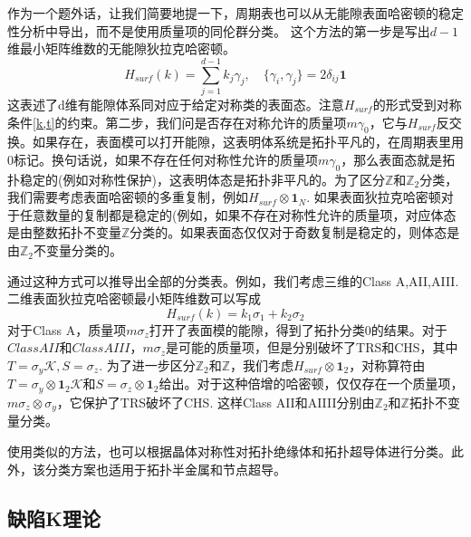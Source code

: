 \documentclass[a4paper]{article}
\numberwithin{equation}{subsection}
\begin{document}
作为一个题外话，让我们简要地提一下，周期表也可以从无能隙表面哈密顿的稳定性分析中导出，而不是使用质量项的同伦群分类。 这个方法的第一步是写出$d-1$维最小矩阵维数的无能隙狄拉克哈密顿。
\begin{equation}
    H_{surf}(k)=\sum_{j=1}^{d-1}k_j\gamma_j,\quad\{\gamma_i,\gamma_j\}=2\delta_{ij}\mathbf{1}
\end{equation}
这表述了d维有能隙体系同对应于给定对称类的表面态。注意$H_{surf}$的形式受到对称条件\eqref{k,t}的约束。第二步，我们问是否存在对称允许的质量项$m\gamma_0$，它与$H_{surf}$反交换。如果存在，表面模可以打开能隙，这表明体系统是拓扑平凡的，在周期表里用$0$标记。换句话说，如果不存在任何对称性允许的质量项$m\gamma_0$，那么表面态就是拓扑稳定的(例如对称性保护)，这表明体态是拓扑非平凡的。为了区分$\mathbb{Z}$和$\mathbb{Z}_2$分类，我们需要考虑表面哈密顿的多重复制，例如$H_{surf}\otimes \mathbf{1}_N$. 如果表面狄拉克哈密顿对于任意数量的复制都是稳定的(例如，如果不存在对称性允许的质量项，对应体态是由整数拓扑不变量$\mathbb{Z}$分类的。如果表面态仅仅对于奇数复制是稳定的，则体态是由$\mathbb{Z}_2$不变量分类的。

通过这种方式可以推导出全部的分类表。例如，我们考虑三维的Class A,AII,AIII. 二维表面狄拉克哈密顿最小矩阵维数可以写成
\begin{equation}
    H_{surf}(k)=k_1\sigma_1+k_2\sigma_2
\end{equation}
对于Class A，质量项$m\sigma_z$打开了表面模的能隙，得到了拓扑分类$0$的结果。对于$Class AII$和$Class AIII$，$m\sigma_z$是可能的质量项，但是分别破坏了TRS和CHS，其中$T=\sigma_y\mathcal{K},S=\sigma_z$. 为了进一步区分$\mathbb{Z}_2$和$\mathbb{Z}$，我们考虑$H_{surf}\otimes \mathbf{1}_2$，对称算符由$T=\sigma_y\otimes\mathbf{1}_2\mathcal{K}$和$S=\sigma_z\otimes\mathbf{1}_2$给出。对于这种倍增的哈密顿，仅仅存在一个质量项，$m\sigma_z\otimes\sigma_y$，它保护了TRS破坏了CHS. 这样Class AII和AIIII分别由$\mathbb{Z}_2$和$\mathbb{Z}$拓扑不变量分类。

使用类似的方法，也可以根据晶体对称性对拓扑绝缘体和拓扑超导体进行分类。此外，该分类方案也适用于拓扑半金属和节点超导。

\subsection{缺陷K理论}
\end{document}

